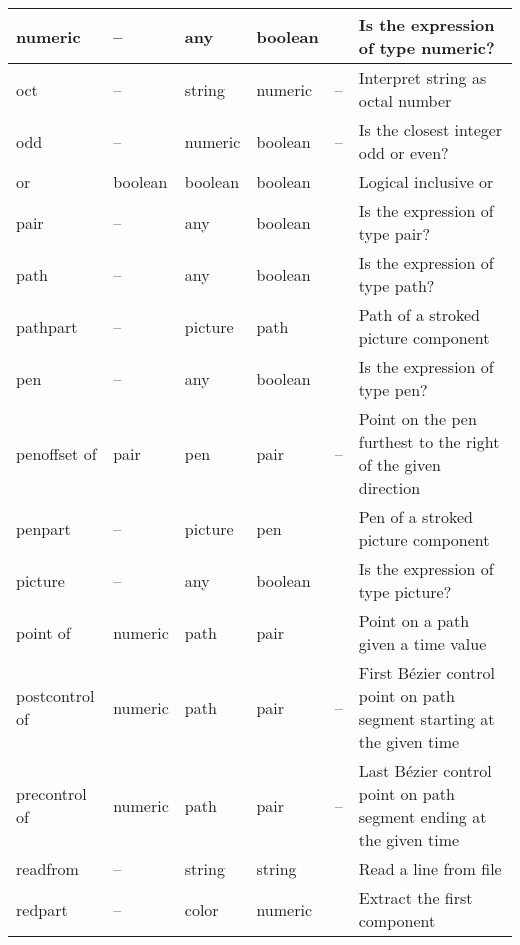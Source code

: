 \begin{longtable}{|>{\raggedright{}\ttfamily}p{.793in}*{3}{|>{\raggedright}p{.715in}}|>{\raggedleft}p{1.5em}|>{\raggedright\arraybackslash}X|}
numeric&  --&  any&  boolean&  \pageref{Dnumop}&  Is the expression of type numeric?\\\hline
oct&  --&  string&  numeric&  --&  Interpret string as octal number\\\hline
odd&  --&  numeric&  boolean&  --&  Is the closest integer odd or even?\\\hline
or&  boolean&  boolean&  boolean&  \pageref{Dor}&  Logical inclusive or\\\hline
pair&  --&  any&  boolean&  \pageref{Dpairop}&  Is the expression of type pair?\\\hline
path&  --&  any&  boolean&  \pageref{Dpathop}&  Is the expression of type path?\\\hline
pathpart&  --&  picture&  path&  \pageref{Dpathpart}&  Path of a stroked picture component\\\hline
pen&  --&  any&  boolean&  \pageref{Dpenop}&  Is the expression of type pen?\\\hline
penoffset of&  pair&  pen&  pair&  --&  Point on the pen furthest to the right of the given direction\\\hline
penpart&  --&  picture&  pen&  \pageref{Dpenpart}&  Pen of a stroked picture component\\\hline
picture&  --&  any&  boolean&  \pageref{Dpictop}&  Is the expression of type picture?\\\hline
point of&  numeric&  path&  pair&  \pageref{Dpntof}&  Point on a path given a time value\\\hline
postcontrol of&  numeric&  path&  pair&  --&  First B\'ezier control point on path segment starting at the given time\\\hline
precontrol of&  numeric&  path&  pair&  --&  Last B\'ezier control point on path segment ending at the given time\\\hline
readfrom&  --&  string&  string&  \pageref{Dreadfrom}&  Read a line from file\\\hline
redpart&  --&  color&  numeric&  \pageref{Drgbprt}&  Extract the first component\\\hline

\end{longtable}
